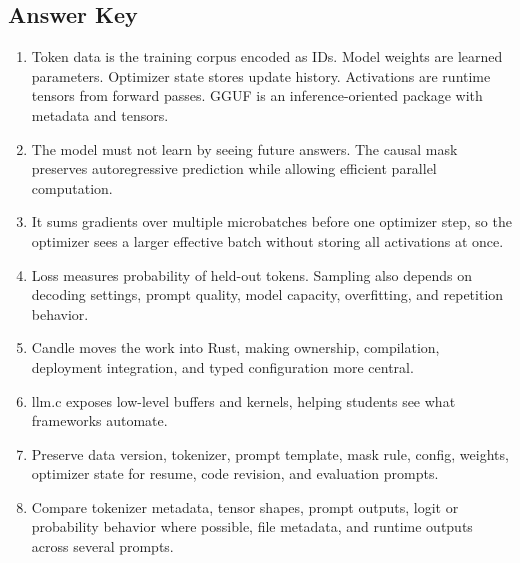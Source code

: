 \subsection*{Answer Key}

\begin{enumerate}
  \item Token data is the training corpus encoded as IDs. Model weights are learned parameters. Optimizer state stores update history. Activations are runtime tensors from forward passes. GGUF is an inference-oriented package with metadata and tensors.
  \item The model must not learn by seeing future answers. The causal mask preserves autoregressive prediction while allowing efficient parallel computation.
  \item It sums gradients over multiple microbatches before one optimizer step, so the optimizer sees a larger effective batch without storing all activations at once.
  \item Loss measures probability of held-out tokens. Sampling also depends on decoding settings, prompt quality, model capacity, overfitting, and repetition behavior.
  \item Candle moves the work into Rust, making ownership, compilation, deployment integration, and typed configuration more central.
  \item llm.c exposes low-level buffers and kernels, helping students see what frameworks automate.
  \item Preserve data version, tokenizer, prompt template, mask rule, config, weights, optimizer state for resume, code revision, and evaluation prompts.
  \item Compare tokenizer metadata, tensor shapes, prompt outputs, logit or probability behavior where possible, file metadata, and runtime outputs across several prompts.
\end{enumerate}
